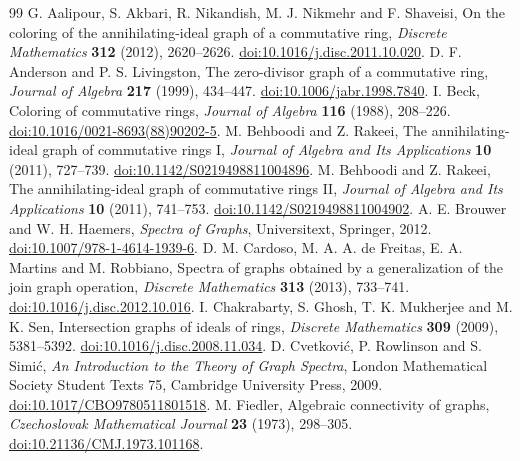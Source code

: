 \begingroup
\small
\begin{thebibliography}{99}
G. Aalipour, S. Akbari, R. Nikandish, M. J. Nikmehr and F. Shaveisi,
On the coloring of the annihilating-ideal graph of a commutative ring,
\emph{Discrete Mathematics} \textbf{312} (2012), 2620--2626.
\href{https://doi.org/10.1016/j.disc.2011.10.020}{doi:10.1016/j.disc.2011.10.020}.
D. F. Anderson and P. S. Livingston,
The zero-divisor graph of a commutative ring,
\emph{Journal of Algebra} \textbf{217} (1999), 434--447.
\href{https://doi.org/10.1006/jabr.1998.7840}{doi:10.1006/jabr.1998.7840}.
I. Beck, Coloring of commutative rings,
\emph{Journal of Algebra} \textbf{116} (1988), 208--226.
\href{https://doi.org/10.1016/0021-8693(88)90202-5}{doi:10.1016/0021-8693(88)90202-5}.
M. Behboodi and Z. Rakeei, The annihilating-ideal graph of commutative rings I,
\emph{Journal of Algebra and Its Applications} \textbf{10} (2011), 727--739.
\href{https://doi.org/10.1142/S0219498811004896}{doi:10.1142/S0219498811004896}.
M. Behboodi and Z. Rakeei, The annihilating-ideal graph of commutative rings II,
\emph{Journal of Algebra and Its Applications} \textbf{10} (2011), 741--753.
\href{https://doi.org/10.1142/S0219498811004902}{doi:10.1142/S0219498811004902}.
A. E. Brouwer and W. H. Haemers,
\emph{Spectra of Graphs}, Universitext, Springer, 2012.
\href{https://doi.org/10.1007/978-1-4614-1939-6}{doi:10.1007/978-1-4614-1939-6}.
D. M. Cardoso, M. A. A. de Freitas, E. A. Martins and M. Robbiano,
Spectra of graphs obtained by a generalization of the join graph operation,
\emph{Discrete Mathematics} \textbf{313} (2013), 733--741.
\href{https://doi.org/10.1016/j.disc.2012.10.016}{doi:10.1016/j.disc.2012.10.016}.
I. Chakrabarty, S. Ghosh, T. K. Mukherjee and M. K. Sen,
Intersection graphs of ideals of rings,
\emph{Discrete Mathematics} \textbf{309} (2009), 5381--5392.
\href{https://doi.org/10.1016/j.disc.2008.11.034}{doi:10.1016/j.disc.2008.11.034}.
D. Cvetkovi\'{c}, P. Rowlinson and S. Simi\'{c},
\emph{An Introduction to the Theory of Graph Spectra},
London Mathematical Society Student Texts 75, Cambridge University Press, 2009.
\href{https://doi.org/10.1017/CBO9780511801518}{doi:10.1017/CBO9780511801518}.
M. Fiedler, Algebraic connectivity of graphs,
\emph{Czechoslovak Mathematical Journal} \textbf{23} (1973), 298--305.
\href{https://doi.org/10.21136/CMJ.1973.101168}{doi:10.21136/CMJ.1973.101168}.

\end{thebibliography}
